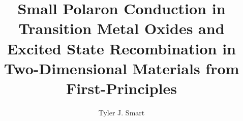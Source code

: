 \documentclass[12pt]{../include/ucthesis}
\begin{document}
\title{Small Polaron Conduction in Transition Metal Oxides and Excited State Recombination in Two-Dimensional Materials from First-Principles}
\author{Tyler J. Smart}
\deanlinethree{}

\begin{frontmatter}
\maketitle

\copyrightpage

\tableofcontents

\listoffigures

\listoftables





\end{frontmatter}

















% 
% 
% 
% 
% 


\appendix








% 


\nocite{*}
% 

\singlespacing


\doublespacing
\end{document}
